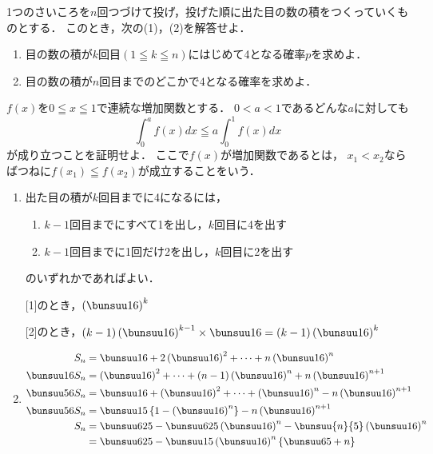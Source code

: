 \begin{problem}
  1つのさいころを$n$回つづけて投げ，投げた順に出た目の数の積をつくっていくものとする．
このとき，次の(1)，(2)を解答せよ．
\begin{enumerate}
\item 目の数の積が$k$回目$(1 \leqq k \leqq n)$にはじめて4となる確率$p$を求めよ．
\item 目の数の積が$n$回目までのどこかで4となる確率を求めよ．
\end{enumerate}

$f(x)$を$0 \leqq x \leqq 1$で連続な増加関数とする．
$0<a<1$であるどんな$a$に対しても
\[ \int_0^af(x)dx \leqq a\int_0^1f(x)dx \]
が成り立つことを証明せよ．
ここで$f(x)$が増加関数であるとは，
$x_1<x_2$ならばつねに$f(x_1) \leqq f(x_2)$が成立することをいう．
\end{problem}

\begin{enumerate}
  \item 出た目の積が$k$回目までに4になるには，
  \begin{enumerate}
    \item $k-1$回目までにすべて1を出し，$k$回目に4を出す
    \item $k-1$回目までに1回だけ2を出し，$k$回目に2を出す
  \end{enumerate}
  のいずれかであればよい．

  [1]のとき，$\left(\bunsuu16\right)^k$

  [2]のとき，$(k-1)\left(\bunsuu16\right)^{k-1} \times \bunsuu16 = (k-1) \left(\bunsuu16\right)^k$

  \item
  \begin{align*}
    S_n &= \bunsuu16 + 2\left(\bunsuu16 \right)^2 + \cdots + n \left(\bunsuu16\right)^n\\
    \bunsuu16S_n &= \left(\bunsuu16\right)^2 + \cdots + (n-1)\left(\bunsuu16\right)^n + n \left(\bunsuu16\right)^{n+1}\\
    \bunsuu56 S_n &= \bunsuu16 + \left(\bunsuu16\right)^2 + \cdots + \left(\bunsuu16\right)^n - n \left(\bunsuu16\right)^{n+1}\\
    \bunsuu56 S_n &= \bunsuu15 \left\{1-\left(\bunsuu16\right)^n\right\} - n \left(\bunsuu16\right)^{n+1} \\
    S_n &= \bunsuu6{25} - \bunsuu6{25}\left(\bunsuu16\right)^n - \bunsuu{n}{5}\left(\bunsuu16\right)^n\\
    &= \bunsuu6{25} - \bunsuu15\left(\bunsuu16\right)^n \left\{\bunsuu65 + n\right\}
  \end{align*}
\end{enumerate}

